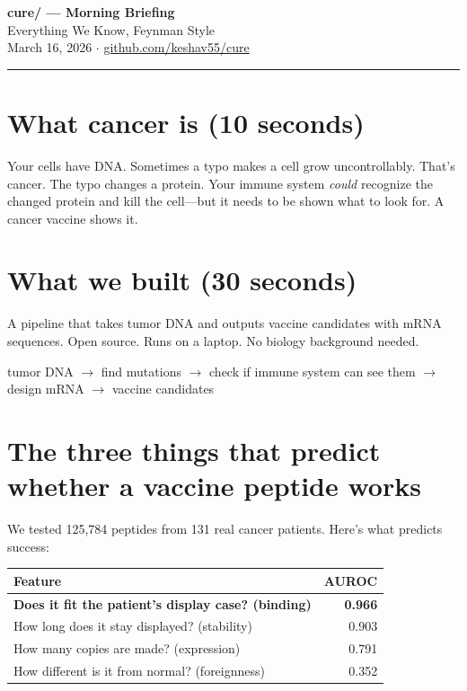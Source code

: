 \documentclass[12pt]{article}
\begin{document}
\begin{center}
{\LARGE\textbf{cure/ — Morning Briefing}}\\[4pt]
{\large Everything We Know, Feynman Style}\\[4pt]
{\small March 16, 2026 $\cdot$ \url{github.com/keshav55/cure}}
\end{center}

\rule{\textwidth}{0.5pt}

\section*{What cancer is (10 seconds)}

Your cells have DNA. Sometimes a typo makes a cell grow uncontrollably. That's cancer. The typo changes a protein. Your immune system \textit{could} recognize the changed protein and kill the cell---but it needs to be shown what to look for. A cancer vaccine shows it.

\section*{What we built (30 seconds)}

A pipeline that takes tumor DNA and outputs vaccine candidates with mRNA sequences. Open source. Runs on a laptop. No biology background needed.

\begin{center}
\small
tumor DNA $\to$ find mutations $\to$ check if immune system can see them $\to$ design mRNA $\to$ vaccine candidates
\end{center}

\section*{The three things that predict whether a vaccine peptide works}

We tested 125,784 peptides from 131 real cancer patients. Here's what predicts success:

\begin{center}
\begin{tabular}{lr}
\toprule
Feature & AUROC \\
\midrule
\textbf{Does it fit the patient's display case? (binding)} & \textbf{0.966} \\
How long does it stay displayed? (stability) & 0.903 \\
How many copies are made? (expression) & 0.791 \\
How different is it from normal? (foreignness) & 0.352 \\
\bottomrule
\end{tabular}
\end{center}
\end{document}
